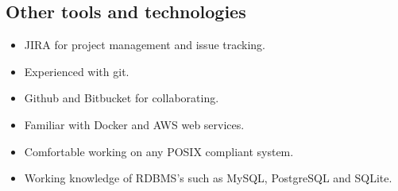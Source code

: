 \documentclass{article}
\begin{document}
\subsection{Other tools and technologies}
\begin{itemize}
    \item JIRA for project management and issue tracking.
    \item Experienced with git.
    \item Github and Bitbucket for collaborating.
    \item Familiar with Docker and AWS web services.
    \item Comfortable working on any POSIX compliant system.
    \item Working knowledge of RDBMS’s such as MySQL, PostgreSQL and SQLite.
\end{itemize}
\end{document}
